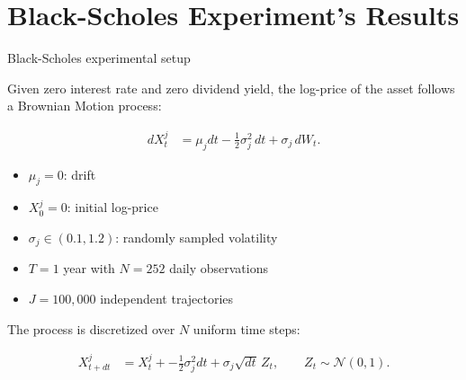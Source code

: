 \section{Black-Scholes Experiment's Results}

\begin{frame}{Black-Scholes experimental setup}

Given zero interest rate and
zero dividend yield, the log-price of the asset follows a Brownian Motion process:

\begin{equation}
\begin{aligned}
dX_t^j
&= \mu_j dt -\frac{1}{2}\sigma_j^2\,dt
+ \sigma_j\,dW_t .
\end{aligned}
\end{equation}


\vspace{0.1cm}

\begin{itemize}
    \item $\mu_j = 0$: drift
    \item $X_0^j = 0$: initial log-price
    \item $\sigma_j \in (0.1,1.2)$: randomly sampled volatility
    \item $T=1$ year with $N=252$ daily observations
    \item $J=100{,}000$ independent trajectories
\end{itemize}

\vspace{0.15cm}

The process is discretized over $N$ uniform time steps:

\begin{equation}
\begin{aligned}
X_{t+dt}^j
&= X_t^j + -\frac{1}{2}\sigma_j^2dt
+\sigma_j\sqrt{dt}\,Z_t,
\qquad Z_t\sim\mathcal{N}(0,1).
\end{aligned}
\end{equation}

\end{frame}


